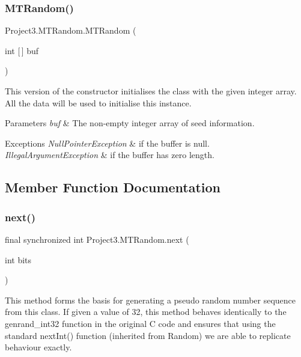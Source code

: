 \subsubsection{\texorpdfstring{MTRandom()}{MTRandom()}\hspace{0.1cm}{\footnotesize\ttfamily [5/5]}}
{\footnotesize\ttfamily Project3.\+M\+T\+Random.\+M\+T\+Random (\begin{DoxyParamCaption}\item[{int \mbox{[}$\,$\mbox{]}}]{buf }\end{DoxyParamCaption})}

This version of the constructor initialises the class with the given integer array. All the data will be used to initialise this instance.


\begin{DoxyParams}{Parameters}
{\em buf} & The non-\/empty integer array of seed information. \\
\hline
\end{DoxyParams}

\begin{DoxyExceptions}{Exceptions}
{\em Null\+Pointer\+Exception} & if the buffer is null. \\
\hline
{\em Illegal\+Argument\+Exception} & if the buffer has zero length. \\
\hline
\end{DoxyExceptions}


\subsection{Member Function Documentation}
\mbox{\label{class_project3_1_1_m_t_random_aa2bb6d5222e59c49548d8f29a9e14be6}} 
\subsubsection{\texorpdfstring{next()}{next()}}
{\footnotesize\ttfamily final synchronized int Project3.\+M\+T\+Random.\+next (\begin{DoxyParamCaption}\item[{int}]{bits }\end{DoxyParamCaption})\hspace{0.3cm}{\ttfamily [protected]}}

This method forms the basis for generating a pseudo random number sequence from this class. If given a value of 32, this method behaves identically to the genrand\+\_\+int32 function in the original C code and ensures that using the standard next\+Int() function (inherited from Random) we are able to replicate behaviour exactly. 

